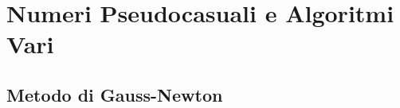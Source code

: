 \chapter{Numeri Pseudocasuali e Algoritmi Vari}
\section{Metodo di Gauss-Newton}\label{appendixC:gaussNewton}
